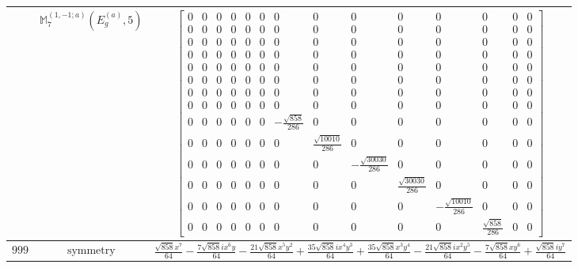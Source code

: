 \documentclass[fleqn,8pt,landscape]{jsarticle}
\begin{document}
\begin{longtable}{ccc}
$  $ & $ \mathbb{M}_{7}^{(1,-1;a)}(E_{g}^{(a)},5) $ & $ \begin{bmatrix} 0 & 0 & 0 & 0 & 0 & 0 & 0 & 0 & 0 & 0 & 0 & 0 & 0 & 0 \\ 0 & 0 & 0 & 0 & 0 & 0 & 0 & 0 & 0 & 0 & 0 & 0 & 0 & 0 \\ 0 & 0 & 0 & 0 & 0 & 0 & 0 & 0 & 0 & 0 & 0 & 0 & 0 & 0 \\ 0 & 0 & 0 & 0 & 0 & 0 & 0 & 0 & 0 & 0 & 0 & 0 & 0 & 0 \\ 0 & 0 & 0 & 0 & 0 & 0 & 0 & 0 & 0 & 0 & 0 & 0 & 0 & 0 \\ 0 & 0 & 0 & 0 & 0 & 0 & 0 & 0 & 0 & 0 & 0 & 0 & 0 & 0 \\ 0 & 0 & 0 & 0 & 0 & 0 & 0 & 0 & 0 & 0 & 0 & 0 & 0 & 0 \\ 0 & 0 & 0 & 0 & 0 & 0 & 0 & 0 & 0 & 0 & 0 & 0 & 0 & 0 \\ 0 & 0 & 0 & 0 & 0 & 0 & - \frac{\sqrt{858}}{286} & 0 & 0 & 0 & 0 & 0 & 0 & 0 \\ 0 & 0 & 0 & 0 & 0 & 0 & 0 & \frac{\sqrt{10010}}{286} & 0 & 0 & 0 & 0 & 0 & 0 \\ 0 & 0 & 0 & 0 & 0 & 0 & 0 & 0 & - \frac{\sqrt{30030}}{286} & 0 & 0 & 0 & 0 & 0 \\ 0 & 0 & 0 & 0 & 0 & 0 & 0 & 0 & 0 & \frac{\sqrt{30030}}{286} & 0 & 0 & 0 & 0 \\ 0 & 0 & 0 & 0 & 0 & 0 & 0 & 0 & 0 & 0 & - \frac{\sqrt{10010}}{286} & 0 & 0 & 0 \\ 0 & 0 & 0 & 0 & 0 & 0 & 0 & 0 & 0 & 0 & 0 & \frac{\sqrt{858}}{286} & 0 & 0 \end{bmatrix} $ \\ \hline
$ 999 $ & $ \text{symmetry} $ & $ \frac{\sqrt{858} x^{7}}{64} - \frac{7 \sqrt{858} i x^{6} y}{64} - \frac{21 \sqrt{858} x^{5} y^{2}}{64} + \frac{35 \sqrt{858} i x^{4} y^{3}}{64} + \frac{35 \sqrt{858} x^{3} y^{4}}{64} - \frac{21 \sqrt{858} i x^{2} y^{5}}{64} - \frac{7 \sqrt{858} x y^{6}}{64} + \frac{\sqrt{858} i y^{7}}{64} $ \\

\end{longtable}
\end{document}
